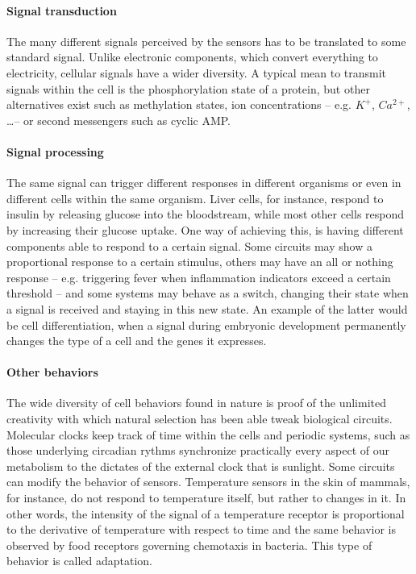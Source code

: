 \paragraph{Signal transduction} The many different signals perceived by the sensors has to be translated to some standard signal. Unlike electronic components, which convert everything to electricity, cellular signals have a wider diversity. A typical mean to transmit signals within the cell is the phosphorylation state of a protein, but other alternatives exist such as methylation states, ion concentrations -- e.g. $K^+$, $Ca^{2+}$, \dots -- or second messengers such as cyclic AMP.
\paragraph{Signal processing} The same signal can trigger different responses in different organisms or even in different cells within the same organism. Liver cells, for instance, respond to insulin by releasing glucose into the bloodstream, while most other cells respond by increasing their glucose uptake. One way of achieving this, is having different components able to respond to a certain signal. Some circuits may show a proportional response to a certain stimulus, others may have an all or nothing response -- e.g. triggering fever when inflammation indicators exceed a certain threshold -- and some systems may behave as a switch, changing their state when a signal is received and staying in this new state. An example of the latter would be cell differentiation, when a signal during embryonic development permanently changes the type of a cell and the genes it expresses.

\paragraph{Other behaviors} The wide diversity of cell behaviors found in nature is proof of the unlimited creativity with which natural selection has been able tweak biological circuits. Molecular clocks keep track of time within the cells and periodic systems, such as those underlying circadian rythms synchronize practically every aspect of our metabolism to the dictates of the  external clock that is sunlight. Some circuits can modify the behavior of sensors. Temperature sensors in the skin of mammals, for instance, do not respond to temperature itself, but rather to changes in it. In other words, the intensity of the signal of a temperature receptor is proportional to the derivative of temperature with respect to time and the same behavior is observed by food receptors governing chemotaxis in bacteria. This type of behavior is called adaptation. 


